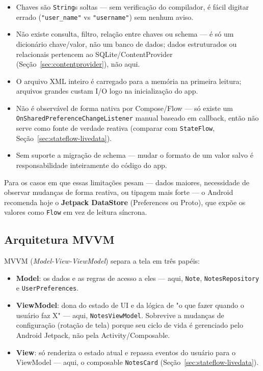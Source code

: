 \documentclass[11pt,a4paper]{article}
\begin{document}
\begin{itemize}
    \item Chaves são \texttt{String}s soltas — sem verificação do
    compilador, é fácil digitar errado (\texttt{"user\_name"} vs
    \texttt{"username"}) sem nenhum aviso.
    \item Não existe consulta, filtro, relação entre chaves ou schema —
    é só um dicionário chave/valor, não um banco de dados; dados
    estruturados ou relacionais pertencem ao SQLite/ContentProvider
    (Seção~\ref{sec:contentprovider}), não aqui.
    \item O arquivo XML inteiro é carregado para a memória na primeira
    leitura; arquivos grandes custam I/O logo na inicialização do app.
    \item Não é observável de forma nativa por Compose/Flow — só existe
    um \texttt{OnSharedPreferenceChangeListener} manual baseado em
    callback, então não serve como fonte de verdade reativa (comparar
    com \texttt{StateFlow}, Seção~\ref{sec:stateflow-livedata}).
    \item Sem suporte a migração de schema — mudar o formato de um valor
    salvo é responsabilidade inteiramente do código do app.
\end{itemize}

Para os casos em que essas limitações pesam — dados maiores, necessidade
de observar mudanças de forma reativa, ou tipagem mais forte — o Android
recomenda hoje o \textbf{Jetpack DataStore} (Preferences ou Proto), que
expõe os valores como \texttt{Flow} em vez de leitura síncrona.

\subsection{Arquitetura MVVM}
\label{sec:mvvm}

MVVM (\emph{Model-View-ViewModel}) separa a tela em três papéis:

\begin{itemize}
    \item \textbf{Model}: os dados e as regras de acesso a eles —
    aqui, \texttt{Note}, \texttt{NotesRepository} e
    \texttt{UserPreferences}.
    \item \textbf{ViewModel}: dona do estado de UI e da lógica de
    "o que fazer quando o usuário faz X" — aqui,
    \texttt{NotesViewModel}. Sobrevive a mudanças de configuração
    (rotação de tela) porque seu ciclo de vida é gerenciado pelo
    Android Jetpack, não pela Activity/Composable.
    \item \textbf{View}: só renderiza o estado atual e repassa eventos
    do usuário para o ViewModel — aqui, o composable
    \texttt{NotesCard} (Seção~\ref{sec:stateflow-livedata}).
\end{itemize}
\end{document}
